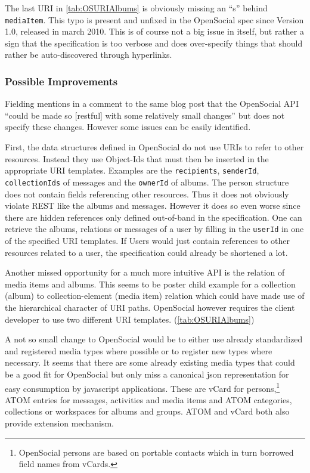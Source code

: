 \documentclass[12pt,a4paper,twoside]{scrartcl}		%
\begin{document}
The last URI in \autoref{tab:OSURIAlbums} is obviously missing an ``s'' behind
\texttt{mediaItem}. This typo is present and unfixed in the OpenSocial spec
since Version 1.0, released in march 2010. This is of course not a big issue in
itself, but rather a sign that the specification is too verbose and does
over-specify things that should rather be auto-discovered through hyperlinks.

\subsubsection{Possible Improvements}
\label{sec:poss-impr}

Fielding mentions in a comment to the same blog post\cite{Fielding2008} that the
OpenSocial API ``could be made so [restful] with some relatively small changes''
but does not specify these changes. However some issues can be easily
identified.

First, the data structures defined in OpenSocial do not use URIs to refer to
other resources. Instead they use Object-Ids that must then be inserted in the
appropriate URI templates. Examples are the \texttt{recipients},
\texttt{senderId}, \texttt{collectionIds} of messages and the \texttt{ownerId}
of albums. The person structure does not contain fields referencing other
resources. Thus it does not obviously violate REST like the albums and
messages. However it does so even worse since there are hidden references only
defined out-of-band in the specification. One can retrieve the albums, relations
or messages of a user by filling in the \texttt{userId} in one of the specified
URI templates. If Users would just contain references to other resources related
to a user, the specification could already be shortened a lot.

Another missed opportunity for a much more intuitive API is the relation of
media items and albums. This seems to be poster child example for a collection
(album) to collection-element (media item) relation which could have made use of
the hierarchical character of URI paths. OpenSocial however requires the client
developer to use two different URI templates. (\autoref{tab:OSURIAlbums})

A not so small change to OpenSocial would be to either use already standardized
and registered media types where possible or to register new types where
necessary. It seems that there are some already existing media types that could
be a good fit for OpenSocial but only miss a canonical json representation for
easy consumption by javascript applications. These are vCard for
persons,\footnote{OpenSocial persons are based on portable contacts which in
  turn borrowed field names from vCards.} ATOM entries\cite{RFC4287} for
messages, activities and media items and ATOM categories, collections or
workspaces\cite{RFC5023} for albums and groups. ATOM and vCard both also provide
extension mechanism.
  
\end{document}

